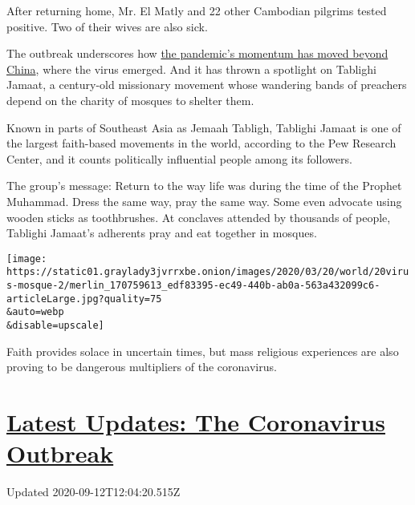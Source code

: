 After returning home, Mr. El Matly and 22 other Cambodian pilgrims
tested positive. Two of their wives are also sick.

The outbreak underscores how
\href{https://www.nytimes3xbfgragh.onion/2020/03/19/world/asia/coronavirus-china-united-states.html}{the
pandemic's momentum has moved beyond China}, where the virus emerged.
And it has thrown a spotlight on Tablighi Jamaat, a century-old
missionary movement whose wandering bands of preachers depend on the
charity of mosques to shelter them.

Known in parts of Southeast Asia as Jemaah Tabligh, Tablighi Jamaat is
one of the largest faith-based movements in the world, according to the
Pew Research Center, and it counts politically influential people among
its followers.

The group's message: Return to the way life was during the time of the
Prophet Muhammad. Dress the same way, pray the same way. Some even
advocate using wooden sticks as toothbrushes. At conclaves attended by
thousands of people, Tablighi Jamaat's adherents pray and eat together
in mosques.

\texttt{[image: https://static01.graylady3jvrrxbe.onion/images/2020/03/20/world/20virus-mosque-2/merlin\_170759613\_edf83395-ec49-440b-ab0a-563a432099c6-articleLarge.jpg?quality=75\\\&auto=webp\\\&disable=upscale]}

Faith provides solace in uncertain times, but mass religious experiences
are also proving to be dangerous multipliers of the coronavirus.

\hypertarget{latest-updates-the-coronavirus-outbreak}{%
\section{\texorpdfstring{\href{https://www.nytimes3xbfgragh.onion/2020/09/11/world/covid-19-coronavirus.html?action=click\&pgtype=Article\&state=default\&region=MAIN_CONTENT_1\&context=storylines_live_updates}{Latest
Updates: The Coronavirus
Outbreak}}{Latest Updates: The Coronavirus Outbreak}}\label{latest-updates-the-coronavirus-outbreak}}

Updated 2020-09-12T12:04:20.515Z

